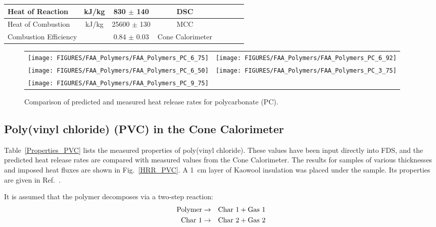 \begin{table}[h!]
\begin{center}
\begin{tabular}{|l|c|c|c|c|c|l|l|}
Heat of Reaction            & kJ/kg         & 830 $\pm$ 140                     & DSC                   &  \cite{Stoliarov:PDS2008}     \\ \hline
Heat of Combustion          & kJ/kg         & 25600 $\pm$ 130                   & MCC                   &  \cite{Stoliarov:CF2010}      \\ \hline
Combustion Efficiency       &               & 0.84 $\pm$ 0.03                   & Cone Calorimeter      &  \cite{Stoliarov:CF2010}      \\ \hline
\end{tabular}
\end{center}
\label{Properties_PC}
\end{table}

\begin{figure}[p]
\begin{tabular*}{\textwidth}{l@{\extracolsep{\fill}}r}
\texttt{[image: FIGURES/FAA\_Polymers/FAA\_Polymers\_PC\_6\_75]} &
\texttt{[image: FIGURES/FAA\_Polymers/FAA\_Polymers\_PC\_6\_92]} \\
\texttt{[image: FIGURES/FAA\_Polymers/FAA\_Polymers\_PC\_6\_50]} &
\texttt{[image: FIGURES/FAA\_Polymers/FAA\_Polymers\_PC\_3\_75]} \\
\texttt{[image: FIGURES/FAA\_Polymers/FAA\_Polymers\_PC\_9\_75]} &
\end{tabular*}
\caption[Heat release rate of polycarbonate (PC).]{Comparison of predicted and measured heat release rates for polycarbonate (PC).}
\label{HRR_PC}
\end{figure}

\clearpage


\subsection{Poly(vinyl chloride) (PVC) in the Cone Calorimeter}

Table~\ref{Properties_PVC} lists the measured properties of poly(vinyl chloride). These values have been input directly into FDS, and the predicted heat release rates
are compared with measured values from the Cone
Calorimeter. The results for samples of various thicknesses and imposed heat fluxes are shown in Fig.~\ref{HRR_PVC}.
A 1~cm layer of Kaowool insulation was placed under the sample. Its properties are given in Ref.~\cite{Stoliarov:CF2010}.

It is assumed that the polymer decomposes via a two-step reaction:
\begin{eqnarray}
   \hbox{Polymer} &\to& \hbox{Char 1} + \hbox{Gas 1}  \\
   \hbox{Char 1}  &\to& \hbox{Char 2} + \hbox{Gas 2}  
\end{eqnarray}


